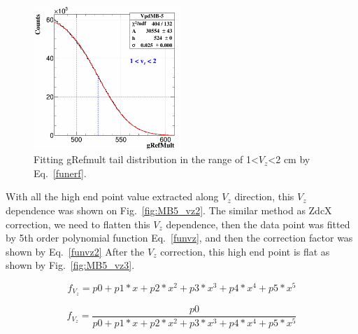 \begin{figure}[htbp]
\centering
\includegraphics[keepaspectratio,width=0.5\textwidth]{figure/Run14_D0HFT/MB5_Vzcor1.png}
\caption{Fitting gRefmult tail distribution in the range of 1<$V_{z}$<2 cm by Eq.~\ref{funerf}.}
 \label{fig:MB5_vz1}
\end{figure}

With all the high end point value extracted along $V_{z}$ direction, this $V_{z}$ dependence was shown on Fig.~\ref{fig:MB5_vz2}. The similar method as ZdcX correction, we need to flatten this $V_{z}$ dependence, then the data point was fitted by 5th order polynomial function Eq.~\ref{funvz}, and then the correction factor was shown by Eq.~\ref{funvz2}
After the $V_{z}$ correction, this high end point is flat as shown by Fig.~\ref{fig:MB5_vz3}.

\begin{equation}
  f_{V_{z}} = p0 + p1*x + p2*x^2 + p3*x^3 + p4*x^4 + p5*x^5
\label{funvz}
\end{equation}

\begin{equation}
  f_{V_{z}} = \frac{p0}{p0 + p1*x + p2*x^2 + p3*x^3 + p4*x^4 + p5*x^5}
\label{funvz2}
\end{equation}


